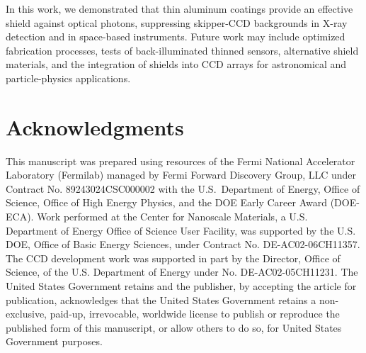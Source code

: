 \documentclass[twocolumn]{aastex631}
\begin{document}
In this work, we demonstrated that thin aluminum coatings provide an effective shield against optical photons, suppressing skipper-CCD backgrounds in X-ray detection and in space-based instruments. Future work may include optimized fabrication processes, tests of back-illuminated thinned sensors, alternative shield materials, and the integration of shields into CCD arrays for astronomical and particle-physics applications. 


\section{Acknowledgments}


This manuscript was prepared using resources of the Fermi National Accelerator Laboratory (Fermilab) managed by Fermi Forward Discovery Group, LLC under Contract No. 89243024CSC000002 with the U.S.~Department of Energy, Office of Science, Office of High Energy Physics, and the DOE Early Career Award (DOE-ECA). Work performed at the Center for Nanoscale Materials, a U.S. Department of Energy Office of Science User Facility, was supported by the U.S. DOE, Office of Basic Energy Sciences, under Contract No. DE-AC02-06CH11357. The CCD development work was supported in part by the Director, Office of Science, of the U.S. Department of Energy under No. DE-AC02-05CH11231. The United States Government retains and the publisher, by accepting the article for publication, acknowledges that the United States Government retains a non-exclusive, paid-up, irrevocable, worldwide license to publish or reproduce the published form of this manuscript, or allow others to do so, for United States Government purposes.




{}

\end{document}
